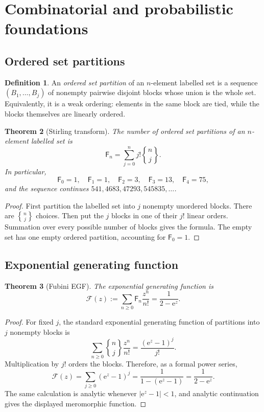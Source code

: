 \documentclass[11pt,a4paper,oneside]{article}
\newtheorem{theorem}{Theorem}[section]
\theoremstyle{definition}
\newtheorem{definition}[theorem]{Definition}
\theoremstyle{remark}
\newcommand{\Fub}{\mathsf{F}}
\newcommand{\StirlingII}[2]{\genfrac\{\}{0pt}{}{#1}{#2}}
\newcommand{\e}{\mathrm{e}}
\begin{document}
\section{Combinatorial and probabilistic foundations}\label{sec:foundations}

\subsection{Ordered set partitions}

\begin{definition}
An \emph{ordered set partition} of an $n$-element labelled set is a sequence
$(B_1,\ldots,B_j)$ of nonempty pairwise disjoint blocks whose union is the
whole set.  Equivalently, it is a weak ordering: elements in the same block
are tied, while the blocks themselves are linearly ordered.
\end{definition}

\begin{theorem}[Stirling transform]\label{thm:stirling-sum}
The number of ordered set partitions of an $n$-element labelled set is
\[
 \Fub_n=\sum_{j=0}^{n}j!\StirlingII{n}{j}.
\]
In particular,
\[
 \Fub_0=1,\quad \Fub_1=1,\quad \Fub_2=3,\quad \Fub_3=13,
 \quad \Fub_4=75,
\]
and the sequence continues $541,4683,47293,545835,\ldots$.
\end{theorem}

\begin{proof}
First partition the labelled set into $j$ nonempty unordered blocks.  There
are $\StirlingII{n}{j}$ choices.  Then put the $j$ blocks in one of their $j!$
linear orders.  Summation over every possible number of blocks gives the
formula.  The empty set has one empty ordered partition, accounting for
$\Fub_0=1$.
\end{proof}

\subsection{Exponential generating function}

\begin{theorem}[Fubini EGF]\label{thm:egf}
The exponential generating function is
\[
 \mathcal F(z):=\sum_{n\ge0}\Fub_n\frac{z^n}{n!}
 =\frac{1}{2-\e^z}.
\]
\end{theorem}

\begin{proof}
For fixed $j$, the standard exponential generating function of partitions
into $j$ nonempty blocks is
\[
 \sum_{n\ge0}\StirlingII{n}{j}\frac{z^n}{n!}
 =\frac{(\e^z-1)^j}{j!}.
\]
Multiplication by $j!$ orders the blocks.  Therefore, as a formal power series,
\[
 \mathcal F(z)
 =\sum_{j\ge0}(\e^z-1)^j
 =\frac{1}{1-(\e^z-1)}
 =\frac{1}{2-\e^z}.
\]
The same calculation is analytic whenever $|\e^z-1|<1$, and analytic
continuation gives the displayed meromorphic function.
\end{proof}
\end{document}
